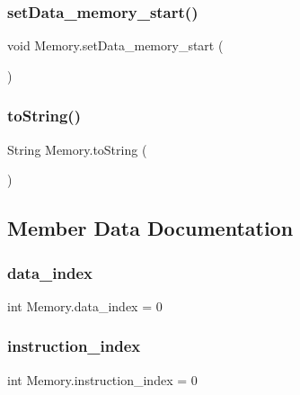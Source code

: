 \subsubsection{\texorpdfstring{set\+Data\+\_\+memory\+\_\+start()}{setData\_memory\_start()}}
{\footnotesize\ttfamily void Memory.\+set\+Data\+\_\+memory\+\_\+start (\begin{DoxyParamCaption}{ }\end{DoxyParamCaption})\hspace{0.3cm}{\ttfamily [package]}}

\mbox{\label{class_memory_a45c16fbed000105573cba5d6b1f4e727}} 
\subsubsection{\texorpdfstring{to\+String()}{toString()}}
{\footnotesize\ttfamily String Memory.\+to\+String (\begin{DoxyParamCaption}{ }\end{DoxyParamCaption})}



\subsection{Member Data Documentation}
\mbox{\label{class_memory_a12ea5f04133e82e0eef1358bc6181747}} 
\subsubsection{\texorpdfstring{data\+\_\+index}{data\_index}}
{\footnotesize\ttfamily int Memory.\+data\+\_\+index = 0\hspace{0.3cm}{\ttfamily [private]}}

\mbox{\label{class_memory_a1a44efd4867dad33ce936039c19ad4aa}} 
\subsubsection{\texorpdfstring{instruction\+\_\+index}{instruction\_index}}
{\footnotesize\ttfamily int Memory.\+instruction\+\_\+index = 0\hspace{0.3cm}{\ttfamily [private]}}

